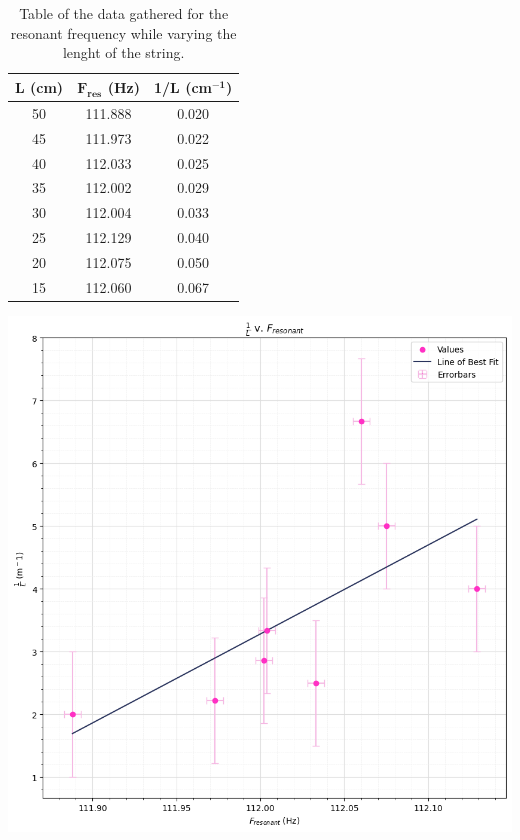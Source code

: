 \documentclass[12pt]{article}
\begin{document}
\begin{minipage}{0.45\textwidth}
    \captionsetup{hypcap=false}
\begin{table}[H]
    \centering
    \begin{tabular}{|c|c|c|}
    \hline
    \textbf{L (cm)} & \textbf{$\mathbf{F_{res}}$ (Hz)} & \textbf{1/L (cm$\mathbf{^{-1}}$)} \\ \hline
    50 & 111.888 & 0.020 \\ \hline
    45 & 111.973 & 0.022 \\ \hline
    40 & 112.033 & 0.025 \\ \hline
    35 & 112.002 & 0.029 \\ \hline
    30 & 112.004 & 0.033 \\ \hline
    25 & 112.129 & 0.040 \\ \hline
    20 & 112.075 & 0.050 \\ \hline
    15 & 112.060 & 0.067 \\ \hline
    \end{tabular}
    \caption{\centering Table of the data gathered for the resonant frequency while varying the lenght of the string.}
    \label{tab:1}
\end{table}
\end{minipage}
\hfill
\begin{minipage}{.5\textwidth}
    \captionsetup{hypcap=false}
    \includegraphics[width=\linewidth]{waves length graph.png}
    \label{fig:lengthgraph}
\end{minipage}
\end{document}
